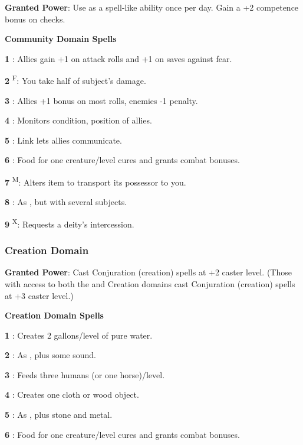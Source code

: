 \textbf{Granted Power}: Use  as a spell-like ability once per day. Gain a +2 competence bonus on  checks.

\textbf{Community Domain Spells}

\textbf{1} : Allies gain +1 on attack rolls and +1 on saves against fear.

\textbf{2} \textsuperscript{F}: You take half of subject's damage.

\textbf{3} : Allies +1 bonus on most rolls, enemies -1 penalty.

\textbf{4} : Monitors condition, position of allies.

\textbf{5} :  Link lets allies communicate.

\textbf{6} : Food for one creature/level cures and grants combat bonuses.

\textbf{7} \textsuperscript{M}: Alters item to transport its possessor to you.

\textbf{8} : As , but with several subjects.

\textbf{9} \textsuperscript{X}: Requests a deity's intercession.

\subsubsection{Creation Domain}

\textbf{Granted Power}: Cast Conjuration (creation) spells at +2 caster level. (Those with access to both the  and Creation domains cast Conjuration (creation) spells at +3 caster level.)

\textbf{Creation Domain Spells}

\textbf{1} : Creates 2 gallons/level of pure water.

\textbf{2} : As , plus some sound.

\textbf{3} : Feeds three humans (or one horse)/level.

\textbf{4} : Creates one cloth or wood object.

\textbf{5} : As , plus stone and metal.

\textbf{6} : Food for one creature/level cures and grants combat bonuses.

